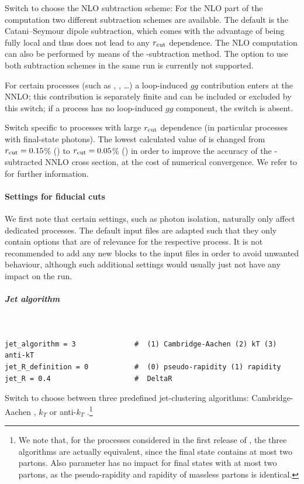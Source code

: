 \documentclass[english,11pt]{article}
\begin{document}
\quad Switch to choose the NLO subtraction scheme: For the NLO part of the computation two 
different subtraction schemes are available. The default is the Catani--Seymour 
dipole subtraction, which comes with the advantage of being fully local and thus does not lead to any $r_{\mathrm{cut}}{}$ 
dependence. The NLO computation can also be performed by means of the \qt{}-subtraction method.
The option to use both subtraction schemes in the same run is currently not supported.

\quad For certain processes (such as \zz{}, \ww{}, \ldots{}) a loop-induced $gg$ contribution enters at the NNLO; this contribution is separately finite and 
can be included or excluded by this switch; if a process has no loop-induced $gg$ 
component, the switch is absent.

\quad Switch specific to processes with large $r_{\mathrm{cut}}$ dependence (in particular processes with final-state photons). The lowest calculated value of \rcut{} is
changed from $r_{\mathrm{cut}}=0.15$\% () to $r_{\mathrm{cut}}=0.05$\% () in order to improve
the accuracy of the \qt{}-subtracted NNLO cross section, at the cost of numerical convergence. 
We refer to  for further information. 


\paragraph{Settings for fiducial cuts}
\label{sec:fiducial_cuts}

We first note that certain settings, such as photon isolation, naturally 
only affect dedicated processes. The default input files are adapted such that they only
contain options that are of relevance for the respective process.
It is not recommended to add any new blocks to the input files in order to avoid unwanted
behaviour, although such additional settings would usually just not have any impact
on the run.

\subparagraph{Jet algorithm}\quad
{\tt
\begin{lstlisting}
jet_algorithm =	3              #  (1) Cambridge-Aachen (2) kT (3) anti-kT
jet_R_definition = 0           #  (0) pseudo-rapidity (1) rapidity
jet_R = 0.4                    #  DeltaR
\end{lstlisting}
}

\quad Switch to choose between three predefined jet-clustering algorithms: 
Cambridge-Aachen \cite{Dokshitzer:1997in,Wobisch:1998wt}, $k_T$ \cite{Catani:1993hr} or anti-$k_T$ \cite{Cacciari:2008gp}.\footnote{We note that, for the processes considered in the first release of \Matrix{}, the three algorithms are actually equivalent, since the final state contains at most two partons. Also parameter  has no impact for final states with at 
most two partons, as the pseudo-rapidity and rapidity of massless partons 
is identical.}
\end{document}
